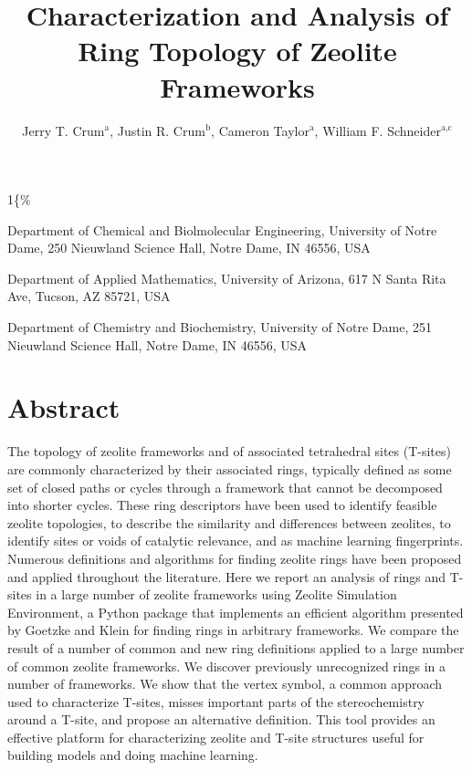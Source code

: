 \documentclass[11pt]{article}
\author{Jerry T. Crum\(^{\text{a}}\), Justin R. Crum\(^{\text{b}}\), Cameron Taylor\(^{\text{a}}\), William F. Schneider\(^{\text{a,c}}\)}
\date{}
\title{Characterization and Analysis of Ring Topology of Zeolite Frameworks}
\begin{document}
\begin{OPTIONS}
\def\udesoftecoverride\#1\mainmatter\{\%
  \AfterEndPreamble{#1\mainmatter}
\end{OPTIONS}

\maketitle

\begin{asparaenum}[\expandafter\textsuperscript a ]
\item Department of Chemical and Biolmolecular Engineering, University of Notre Dame, 250 Nieuwland Science Hall, Notre Dame, IN 46556, USA \\
\item Department of Applied Mathematics, University of Arizona, 617 N Santa Rita Ave, Tucson, AZ 85721, USA\\
\item Department of Chemistry and Biochemistry, University of Notre Dame, 251 Nieuwland Science Hall, Notre Dame, IN 46556, USA
\end{asparaenum}

\newpage
\section{Abstract}
\label{sec:org12f50fd}
The topology of zeolite frameworks and of associated tetrahedral sites (T-sites) are commonly characterized by their associated rings, typically defined as some set of closed paths or cycles through a framework that cannot be decomposed into shorter cycles. These ring descriptors have been used to identify feasible zeolite topologies, to describe the similarity and differences between zeolites, to identify sites or voids of catalytic relevance, and as machine learning fingerprints. Numerous definitions and algorithms for finding zeolite rings have been proposed and applied throughout the literature. Here we report an analysis of rings and T-sites in a large number of zeolite frameworks using Zeolite Simulation Environment, a Python package that implements an efficient algorithm presented by Goetzke and Klein for finding rings in arbitrary frameworks. We compare the result of a number of common and new ring definitions applied to a large number of common zeolite frameworks. We discover previously unrecognized rings in a number of frameworks. We show that the vertex symbol, a common approach used to characterize T-sites, misses important parts of the stereochemistry around a T-site, and propose an alternative definition. This tool provides an effective platform for characterizing zeolite and T-site structures useful for building models and doing machine learning. 
\end{document}
